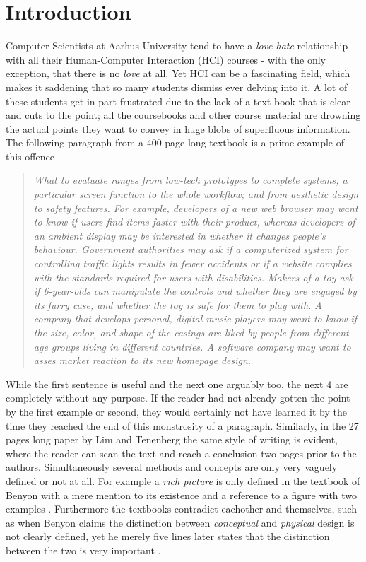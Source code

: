 \chapter{Introduction} \label{chap:introduction} Computer Scientists at Aarhus
University tend to have a \emph{love-hate} relationship with all their
Human-Computer Interaction (HCI) courses - with the only exception, that there
is no \emph{love} at all. Yet HCI can be a fascinating field, which makes it
saddening that so many students dismiss ever delving into it. A lot of these
students get in part frustrated due to the lack of a text book that is clear and
cuts to the point; all the coursebooks and other course material are drowning
the actual points they want to convey in huge blobs of superfluous information.
The following paragraph from a 400 page long textbook is a prime example of this
offence

\blockcquote[p. 435]{rogers}{\it What to evaluate ranges from low-tech
  prototypes to complete systems; a particular screen function to the whole
  workflow; and from aesthetic design to safety features. For example,
  developers of a new web browser may want to know if users find items faster
  with their product, whereas developers of an ambient display may be interested
  in whether it changes people's behaviour. Government authorities may ask if a
  computerized system for controlling traffic lights results in fewer accidents
  or if a website complies with the standards required for users with
  disabilities. Makers of a toy ask if 6-year-olds can manipulate the controls
  and whether they are engaged by its furry case, and whether the toy is safe
  for them to play with. A company that develops personal, digital music players
  may want to know if the size, color, and shape of the casings are liked by
  people from different age groups living in different countries. A software
  company may want to asses market reaction to its new homepage design.}

\noindent While the first sentence is useful and the next one arguably too, the
next 4 are completely without any purpose. If the reader had not already gotten
the point by the first example or second, they would certainly not have learned
it by the time they reached the end of this monstrosity of a paragraph.
Similarly, in the 27 pages long paper by Lim and Tenenberg \cite{lim} the same
style of writing is evident, where the reader can scan the text and reach a
conclusion two pages prior to the authors. Simultaneously several methods and
concepts are only very vaguely defined or not at all. For example a \emph{rich
  picture} is only defined in the textbook of Benyon with a mere mention to its
existence and a reference to a figure with two examples \cite[p.
51-52]{benyon14}. Furthermore the textbooks contradict eachother and themselves,
such as when Benyon claims the distinction between \emph{conceptual} and
\emph{physical} design is not clearly defined, yet he merely five lines later
states that the distinction between the two is very important \cite[p.
51]{benyon14}.

